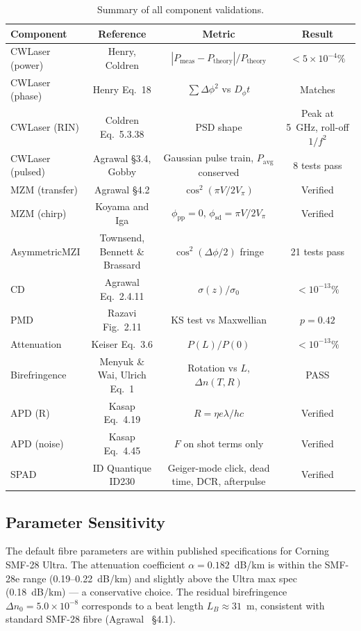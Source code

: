 \documentclass[3p,times,preprint]{elsarticle}
\begin{document}
\begin{table}[htbp]
  \caption{Summary of all component validations.}
  \label{tab:summary}
  \centering
  \begin{tabular}{l c c c}
    \toprule
    Component & Reference & Metric & Result \\
    \midrule
    CWLaser (power) & Henry, Coldren & $|P_{\text{meas}} - P_{\text{theory}}|/P_{\text{theory}}$ & $<5\times10^{-4}\%$ \\
    CWLaser (phase) & Henry Eq.~18 & $\sum\Delta\phi^2$ vs $D_\phi t$ & Matches \\
    CWLaser (RIN) & Coldren Eq.~5.3.38 & PSD shape & Peak at 5~GHz, roll-off $1/f^2$ \\
    CWLaser (pulsed) & Agrawal \S3.4, Gobby & Gaussian pulse train, $P_{\text{avg}}$ conserved & 8 tests pass \\
    MZM (transfer) & Agrawal \S4.2 & $\cos^2(\pi V/2V_\pi)$ & Verified \\
    MZM (chirp) & Koyama and Iga & $\phi_{\text{pp}}=0$, $\phi_{\text{sd}}=\pi V/2V_\pi$ & Verified \\
    AsymmetricMZI & Townsend, Bennett \& Brassard & $\cos^2(\Delta\phi/2)$ fringe & 21 tests pass \\
    CD & Agrawal Eq.~2.4.11 & $\sigma(z)/\sigma_0$ & $<10^{-13}\%$ \\
    PMD & Razavi Fig.~2.11 & KS test vs Maxwellian & $p = 0.42$ \\
    Attenuation & Keiser Eq.~3.6 & $P(L)/P(0)$ & $<10^{-13}\%$ \\
    Birefringence & Menyuk \& Wai, Ulrich Eq.~1 & Rotation vs $L$, $\Delta n(T,R)$ & PASS \\
    APD (R) & Kasap Eq.~4.19 & $R = \eta e\lambda/hc$ & Verified \\
    APD (noise) & Kasap Eq.~4.45 & $F$ on shot terms only & Verified \\
    SPAD & ID Quantique ID230 & Geiger-mode click, dead time, DCR, afterpulse & Verified \\
    \bottomrule
  \end{tabular}
\end{table}

\subsection{Parameter Sensitivity}

The default fibre parameters are within published specifications for
Corning SMF-28 Ultra.  The attenuation coefficient $\alpha = 0.182$~dB/km
is within the SMF-28e range (0.19--0.22~dB/km) and slightly above the
Ultra max spec (0.18~dB/km) --- a conservative choice.  The residual
birefringence $\Delta n_0 = 5.0\times10^{-8}$ corresponds to a beat
length $L_B \approx 31$~m, consistent with standard SMF-28 fibre
(Agrawal~\cite{agrawal5} \S4.1).
\end{document}
